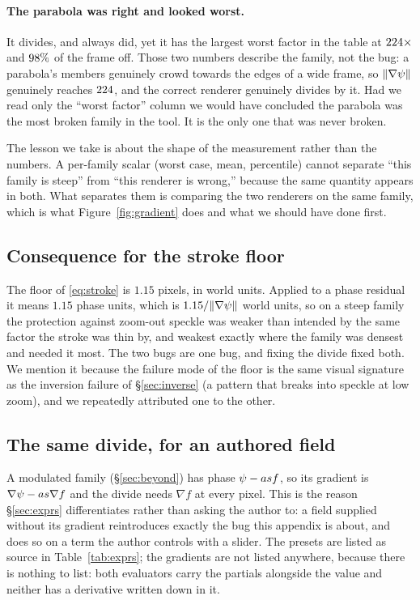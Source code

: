 \paragraph{The parabola was right and looked worst.} It divides, and always did,
yet it has the largest worst factor in the table at $224\times$ and
$98\%$ of the frame off. Those two numbers describe the family, not the
bug: a parabola's members genuinely crowd towards the edges of a wide frame, so
$\lVert\nabla\psi\rVert$ genuinely reaches $224$, and the correct
renderer genuinely divides by it. Had we
read only the ``worst factor'' column we would have concluded the parabola was the
most broken family in the tool. It is the only one that was never broken.

The lesson we take is about the shape of the measurement rather than the numbers.
A per-family scalar (worst case, mean, percentile) cannot separate ``this
family is steep'' from ``this renderer is wrong,'' because the same quantity
appears in both. What separates them is comparing the two renderers on the same
family, which is what Figure~\ref{fig:gradient} does and what we should have done
first.

\subsection{Consequence for the stroke floor}

The floor of \eqref{eq:stroke} is $1.15$ pixels, in world units. Applied to a
phase residual it means $1.15$ phase units, which is $1.15/\lVert\nabla\psi\rVert$
world units, so on a steep family the protection against zoom-out speckle was
weaker than intended by the same factor the stroke was thin by, and weakest
exactly where the family was densest and needed it most. The two bugs are one bug,
and fixing the divide fixed both. We mention it because the failure mode of the
floor is the same visual signature as the inversion failure of
\S\ref{sec:inverse} (a pattern that breaks into speckle at low zoom), and we
repeatedly attributed one to the other.

\subsection{The same divide, for an authored field}

A modulated family (\S\ref{sec:beyond}) has phase $\psi - a s f$, so its gradient is
$\nabla\psi - a s \nabla f$ and the divide needs $\nabla f$ at every pixel. This is
the reason \S\ref{sec:exprs} differentiates rather than asking the author to: a
field supplied without its gradient reintroduces exactly the bug this appendix is
about, and does so on a term the author controls with a slider. The presets are
listed as source in Table~\ref{tab:exprs}; the gradients are not listed anywhere,
because there is nothing to list: both evaluators carry the partials alongside
the value and neither has a derivative written down in it.


